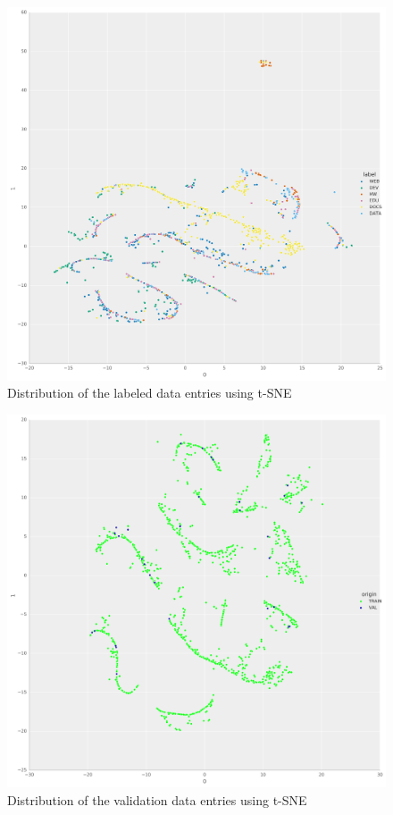\begin{figure}[h]
	\centering
		\includegraphics[width=18cm]{graphics/t-sne-training-data.png}
	\caption{Distribution of the labeled data entries using t-SNE}
	\label{t-sne-training-data}
\end{figure}


\begin{figure}[h]
	\centering
		\includegraphics[width=18cm]{graphics/t-sne-validation-data.png}
	\caption{Distribution of the validation data entries using t-SNE}
	\label{t-sne-validation-data}
\end{figure}

